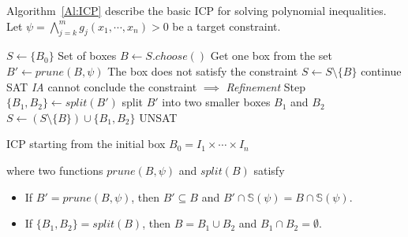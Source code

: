 \documentclass[runningheads,a4paper,oribibl]{llncs}
\begin{document}




Algorithm~\ref{Al:ICP} describe the basic ICP for solving polynomial inequalities.
Let $\psi = \bigwedge\limits_{j=k}^mg_j(x_1, \cdots, x_n) > 0$ be a target constraint. 
\begin{algorithm}
\begin{algorithmic}[1]
\State $S \gets \{B_0\}$ \Comment Set of boxes
  \State $B \gets S.choose()$ \Comment Get one box from the set
  \State $B' \gets prune(B, \psi)$
   \Comment The box does not satisfy the constraint
  	\State $S \gets S \setminus \{B\}$
  	\State continue
  	\State \Return SAT
  \Else \Comment \emph{IA} cannot conclude the constraint $\implies$ \emph{Refinement} Step
  	\State $\{B_1, B_2\} \gets split(B')$ \Comment split $B'$ into two smaller boxes $B_1$ and $B_2$	
  	\State $S \gets (S \setminus \{B\}) \cup \{B_1, B_2\}$
  \EndIf
\EndWhile
\State \Return UNSAT
\end{algorithmic}
\caption{ICP starting from the initial box $B_0 = I_1 \times \cdots \times I_n$}
\label{Al:ICP}
\end{algorithm}

\noindent
where two functions $prune(B,\psi)$ and $split(B)$ satisfy 
\begin{itemize}
\item If $B' = prune (B, \psi)$,
  then $B' \subseteq B $ and $ B' \cap \mathbb{S}(\psi) = B \cap \mathbb{S}(\psi)$. 
\item If $\{B_1, B_2\} = split (B)$,
  then $B = B_1 \cup B_2$ and $B_1 \cap B_2 = \emptyset$. 
\end{itemize}
\end{document}

